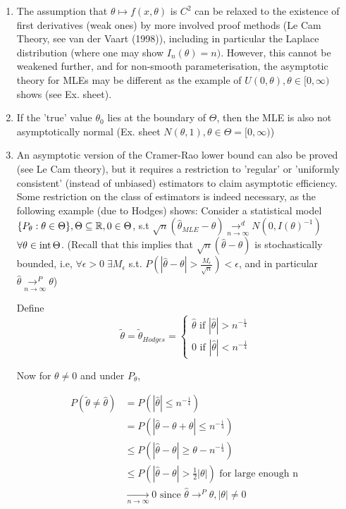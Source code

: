\documentclass[a4paper]{article}
\begin{document}
\begin{remark}
	\begin{enumerate}
		\item The assumption that $\theta \mapsto f(x,\theta)$ is $C^2$ can be relaxed to the existence of first derivatives (weak ones) by more involved proof methods (Le Cam Theory, see van der Vaart (1998)), including in particular the Laplace distribution (where one may show $I_n(\theta) = n)$. However, this cannot be weakened further, and for non-smooth parameterisation, the asymptotic theory for MLEs may be different as the example of $U(0, \theta), \theta \in [0,\infty)$ shows (see Ex. sheet).

		\item If the 'true' value $\theta_0$ lies at the boundary of $\Theta$, then the MLE is also not asymptotically normal (Ex. sheet $N(\theta, 1), \theta \in \Theta = [0, \infty) $)

		\item An asymptotic version of the Cramer-Rao lower bound can also be proved (see Le Cam theory), but it requires a restriction to 'regular' or 'uniformly consistent' (instead of unbiased) estimators to claim asymptotic efficiency. Some restriction on the class of estimators is indeed necessary, as the following example (due to Hodges) shows:
			Consider a statistical model $\{P_{\theta} : \theta \in \Theta \}, \Theta \subseteq \mathbb{R}, 0 \in  \Theta$, s.t $\sqrt{n}(\hat{\theta}_{MLE} - \theta) \underset{n \to \infty}{\to ^{d}} N(0, I(\theta)^{-1})$ $ \forall \theta \in\operatorname{int}\Theta$. (Recall that this implies that $\sqrt{n}(\hat{\theta} - \theta) $ is stochastically bounded, i.e, $\forall \epsilon > 0 \; \exists M_{\epsilon}$ s.t. $P\left( |\hat{\theta} - \theta| > \frac{M_{\epsilon}}{\sqrt{n} } \right) < \epsilon$, and in particular $\hat{\theta} \underset{n\to \infty}{\to ^{P}} \theta$)

			Define \[
				\tilde{\theta} = \tilde{\theta}_{Hodges} = \begin{cases}
					\hat{\theta} \text{ if } |\hat{\theta}| > n^{- \frac{1}{4}}
					\\
				0 \text{ if } |\hat{\theta}| < n^{- \frac{1}{4}}
			\end{cases}
		\] 

		Now for $\theta \neq 0$ and under $P_\theta$,

		 \begin{align*}
			 P\left( \tilde{\theta} \neq \hat{\theta} \right) &= P\left( |\hat{\theta}| \le n^{- \frac{1}{4}} \right) \\
			 &= P\left( |\hat{\theta} - \theta + \theta| \le n^{- \frac{1}{4}} \right) \\
			 &\le P\left( |\hat{\theta} - \theta| \ge \theta - n^{- \frac{1}{4}} \right) \\
			 &\le P\left( |\hat{\theta} - \theta| > \frac{1}{2}|\theta| \right) \text{ for large enough n } \\
			 &\underset{n\to \infty}{\to } 0 \text{ since  } \hat{\theta} \to ^{P} \theta, |\theta|\neq 0
		 \end{align*}


\end{enumerate}
\end{remark}
\end{document}
